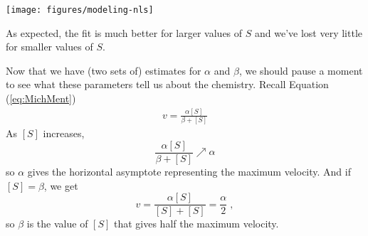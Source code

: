 \documentclass{article}\usepackage{graphicx, color}
\newenvironment{knitrout}{}{} %
\begin{document}
\begin{knitrout}
{\centering \texttt{[image: figures/modeling-nls]} 

}


\end{knitrout}

As expected, the fit is much better for larger values of $S$ and we've lost very little for smaller values of $S$.

Now that we have (two sets of) estimates for $\alpha$ and $\beta$, we should
pause a moment to see what these parameters tell us about the chemistry.
Recall Equation (\ref{eq:MichMent})
	\begin{align*}
	v = \frac{ \alpha [S] }{ \beta + [S] }
	\end{align*}
As $[S]$ increases,
\[
	\frac{ \alpha [S] }{ \beta + [S] } \nearrow \alpha
\]
so $\alpha$ gives the horizontal asymptote representing the maximum velocity.
And if $[S] = \beta$, we get
\[
v = \frac{ \alpha [S] }{ [S] + [S] } = \frac{\alpha}{2} \; ,
\]
so $\beta$ is the value of $[S]$ that gives half the maximum velocity.
\end{document}

